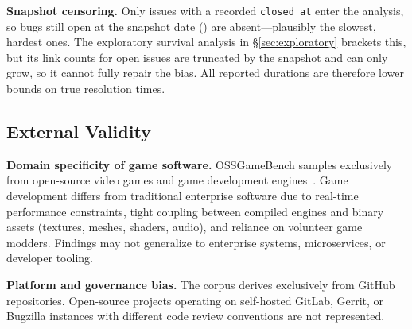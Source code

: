 \textbf{Snapshot censoring.} Only issues with a recorded \texttt{closed\_at} enter the analysis, so bugs still open at the snapshot date (\valsnapshot) are absent—plausibly the slowest, hardest ones. The exploratory survival analysis in \S\ref{sec:exploratory} brackets this, but its link counts for open issues are truncated by the snapshot and can only grow, so it cannot fully repair the bias. All reported durations are therefore lower bounds on true resolution times.

\subsection{External Validity}\label{sec:threats_external}
\textbf{Domain specificity of game software.} OSSGameBench samples exclusively from open-source video games and game development engines~\cite{marsad2026ossgamebench}. Game development differs from traditional enterprise software due to real-time performance constraints, tight coupling between compiled engines and binary assets (textures, meshes, shaders, audio), and reliance on volunteer game modders. Findings may not generalize to enterprise systems, microservices, or developer tooling.

\textbf{Platform and governance bias.} The corpus derives exclusively from GitHub repositories. Open-source projects operating on self-hosted GitLab, Gerrit, or Bugzilla instances with different code review conventions are not represented.
